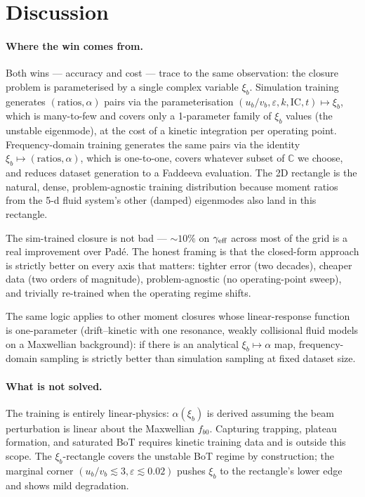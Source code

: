 \documentclass[11pt]{article}
\newcommand{\xib}{\xi_b}
\newcommand{\ub}{u_b}
\newcommand{\vb}{v_b}
\begin{document}
\section{Discussion}

\paragraph{Where the win comes from.} Both wins --- accuracy and cost ---
trace to the same observation: the closure problem is parameterised by a
single complex variable $\xib$. Simulation training generates
$(\mathrm{ratios}, \alpha)$ pairs via the parameterisation $(\ub/\vb,
\varepsilon, k, \mathrm{IC}, t) \mapsto \xib$, which is many-to-few and
covers only a 1-parameter family of $\xib$ values (the unstable
eigenmode), at the cost of a kinetic integration per operating point.
Frequency-domain training generates the same pairs via the identity
$\xib \mapsto (\mathrm{ratios}, \alpha)$, which is one-to-one, covers
whatever subset of $\mathbb{C}$ we choose, and reduces dataset generation
to a Faddeeva evaluation. The 2D rectangle is the natural, dense,
problem-agnostic training distribution because moment ratios from the 5-d
fluid system's other (damped) eigenmodes also land in this rectangle.

The sim-trained closure is not bad --- $\sim\!10\%$ on $\gamma_{\rm eff}$
across most of the grid is a real improvement over Pad\'e. The honest
framing is that the closed-form approach is strictly better on every axis
that matters: tighter error (two decades), cheaper data (two orders of
magnitude), problem-agnostic (no operating-point sweep), and trivially
re-trained when the operating regime shifts.

The same logic applies to other moment closures whose linear-response
function is one-parameter (drift--kinetic with one resonance, weakly
collisional fluid models on a Maxwellian background): if there is an
analytical $\xib \mapsto \alpha$ map, frequency-domain sampling is
strictly better than simulation sampling at fixed dataset size.

\paragraph{What is not solved.} The training is entirely linear-physics:
$\alpha(\xib)$ is derived assuming the beam perturbation is linear about
the Maxwellian $f_{b0}$. Capturing trapping, plateau formation, and
saturated BoT requires kinetic training data and is outside this scope.
The $\xib$-rectangle covers the unstable BoT regime by construction; the
marginal corner $(\ub/\vb \lesssim 3, \varepsilon \lesssim 0.02)$ pushes
$\xib$ to the rectangle's lower edge and shows mild degradation.
\end{document}
